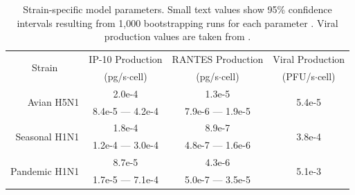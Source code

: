 \documentclass[10pt]{article}
\begin{document}
\begin{table}
\centering
\begin{tabular}{ | r | c | c | c | }
  \hline                        
  \multicolumn{1}{|c|}{\multirow{2}{*}{Strain}} & IP-10 Production & RANTES Production & Viral Production \\
   & \footnotesize{(pg/s$\cdot$cell)}  & \footnotesize{(pg/s$\cdot$cell)} &  \footnotesize{(PFU/s$\cdot$cell)} \\
  \hline
  \multirow{2}{*}{Avian H5N1} & 2.0e-4 &  1.3e-5 & \multirow{2}{*}{5.4e-5} \\
   &  \footnotesize{8.4e-5 --- 4.2e-4} & \footnotesize{7.9e-6 --- 1.9e-5} & \\ 
   \hline
  \multirow{2}{*}{Seasonal H1N1} & 1.8e-4 &  8.9e-7 & \multirow{2}{*}{3.8e-4} \\
   & \footnotesize{1.2e-4 --- 3.0e-4} & \footnotesize{4.8e-7 --- 1.6e-6} &  \\
   \hline
  \multirow{2}{*}{Pandemic H1N1} & 8.7e-5 &  4.3e-6 & \multirow{2}{*}{5.1e-3} \\
   & \footnotesize{1.7e-5 --- 7.1e-4} & \footnotesize{5.0e-7 --- 3.5e-5} &  \\
  \hline
\end{tabular}
\caption{Strain-specific model parameters.  Small text values show 95\% confidence intervals resulting from 1,000 bootstrapping runs for each parameter \cite{Wu1986}.  Viral production values are taken from \cite{Mitchell2011}.}
\label{table:strains}
\end{table}
\end{document}
